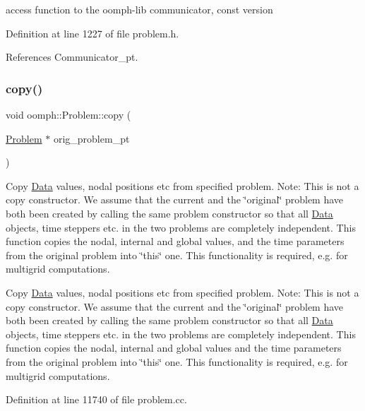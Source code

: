 access function to the oomph-\/lib communicator, const version 



Definition at line 1227 of file problem.\+h.



References Communicator\+\_\+pt.

\mbox{\label{classoomph_1_1Problem_a4ac828f337a2d4e77e566ff95d01bad0}} 
\subsubsection{\texorpdfstring{copy()}{copy()}}
{\footnotesize\ttfamily void oomph\+::\+Problem\+::copy (\begin{DoxyParamCaption}\item[{\hyperlink{classoomph_1_1Problem}{Problem} $\ast$}]{orig\+\_\+problem\+\_\+pt }\end{DoxyParamCaption})}



Copy \hyperlink{classoomph_1_1Data}{Data} values, nodal positions etc from specified problem. Note\+: This is not a copy constructor. We assume that the current and the \char`\"{}original\char`\"{} problem have both been created by calling the same problem constructor so that all \hyperlink{classoomph_1_1Data}{Data} objects, time steppers etc. in the two problems are completely independent. This function copies the nodal, internal and global values, and the time parameters from the original problem into \char`\"{}this\char`\"{} one. This functionality is required, e.\+g. for multigrid computations. 

Copy \hyperlink{classoomph_1_1Data}{Data} values, nodal positions etc from specified problem. Note\+: This is not a copy constructor. We assume that the current and the \char`\"{}original\char`\"{} problem have both been created by calling the same problem constructor so that all \hyperlink{classoomph_1_1Data}{Data} objects, time steppers etc. in the two problems are completely independent. This function copies the nodal, internal and global values and the time parameters from the original problem into \char`\"{}this\char`\"{} one. This functionality is required, e.\+g. for multigrid computations. 

Definition at line 11740 of file problem.\+cc.



